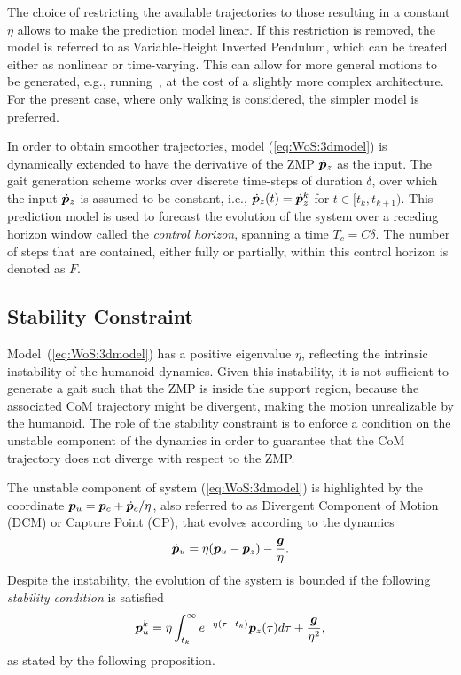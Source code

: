 The choice of restricting the available trajectories to those resulting in a constant $\eta$ allows to make the prediction model linear. If this restriction is removed, the model is referred to as Variable-Height Inverted Pendulum, which can be treated either as nonlinear or time-varying. This can allow for more general motions to be generated, e.g., running~\cite{Smaldone2022Running}, at the cost of a slightly more complex architecture. For the present case, where only walking is considered, the simpler model is preferred.

In order to obtain smoother trajectories, model (\ref{eq:WoS:3dmodel}) is dynamically extended to have the derivative of the ZMP $\dot {{\bm{p}}}_z$ as the input.
The gait generation scheme works over discrete time-steps of duration $\delta$, over which the input $\dot {{\bm{p}}}_z$ is assumed to be constant, i.e., $\dot {{\bm{p}}}_z(t) = \dot {{\bm{p}}}_z^k$ for $t\in[t_k, t_{k+1})$.
This prediction model is used to forecast the evolution of the system over a receding horizon window called the \emph{control horizon}, spanning a time $T_c=C\delta$. The number of steps that are contained, either fully or partially, within this control horizon is denoted as $F$.

\smallskip

\subsection{Stability Constraint}

Model~(\ref{eq:WoS:3dmodel}) has a positive eigenvalue $\eta$, reflecting the intrinsic instability of the humanoid dynamics. Given this instability, it is not sufficient to generate a gait such that the ZMP is inside the support region, because the associated CoM trajectory might be divergent, making the motion unrealizable by the humanoid.
The role of the stability constraint is to enforce a condition on the unstable component of the dynamics in order to guarantee that the CoM trajectory does not diverge with respect to the ZMP.

The unstable component of system (\ref{eq:WoS:3dmodel}) is highlighted by the coordinate ${\bm{p}}_u = {\bm{p}}_c + \dot {{\bm{p}}}_c/\eta$,
also referred to as Divergent Component of Motion (DCM) or Capture Point (CP), that evolves according to the dynamics
\begin{equation}
\dot{{\bm{p}}}_u = \eta({\bm{p}}_u - {\bm{p}}_z) - \frac{{\bm{g}}}{\eta}.
\end{equation}
Despite the instability, the evolution of the system is bounded if the following \emph{stability condition} is satisfied
\begin{equation}
\label{eq:WoS:stabilitycondition}
{\bm{p}}_u^k = \eta\int_{t_k}^{\infty}e^{-\eta(\tau - t_k)}{\bm{p}}_z(\tau) d\tau + \frac{{\bm{g}}}{\eta^2},
\end{equation}
as stated by the following proposition.

